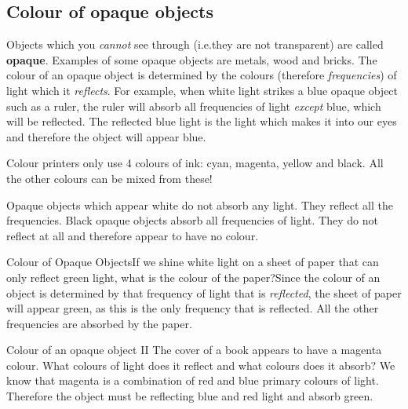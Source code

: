 \vspace{-0.5cm}

\subsection{Colour of opaque objects}
Objects which you \textit{cannot} see through (i.e.\@ they are not transparent) are called \textbf{opaque}. Examples of some opaque objects are metals, wood and bricks. The colour of an opaque object is determined by the colours (therefore \textit{frequencies}) of light which it \textit{reflects}. For example, when white light strikes a blue opaque object such as a ruler, the ruler will absorb all frequencies of light \textit{except} blue, which will be reflected. The reflected blue light is the light which makes it into our eyes and therefore the object will appear blue.

\begin{IFact}
{Colour printers only use 4 colours of ink: cyan, magenta, yellow and black. All the other colours can be mixed from these!}
\end{IFact}

Opaque objects which appear white do not absorb any light. They reflect all the frequencies.
Black opaque objects absorb all frequencies of light. They do not reflect at all and therefore appear to have no colour.

\vspace{-0.5cm}

\begin{wex}
{Colour of Opaque Objects}{If we shine white light on a sheet of paper that can only reflect green light, what is the colour of the paper?}{Since the colour of an object is determined by that frequency of light that is \textit{reflected}, the sheet of paper will appear green, as this is the only frequency that is reflected. All the other frequencies are absorbed by the paper.}
\end{wex}

\begin{wex}{Colour of an opaque object II}
{The cover of a book appears to have a magenta colour. What colours of light does it reflect and what colours does it absorb?\vspace{-0.1cm}}
{We know that magenta is a combination of red and blue primary colours of light. Therefore the object must be reflecting blue and red light and absorb green. }
\end{wex}

\vspace{-1cm}

